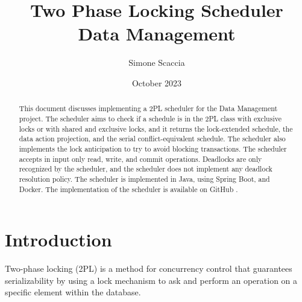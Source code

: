 \documentclass{article}
\title{Two Phase Locking Scheduler \\ Data Management}
\author{Simone Scaccia}
\date{October 2023}
\begin{document}
\maketitle

\begin{abstract}
This document discusses implementing a 2PL scheduler for the Data Management project. The scheduler aims to check if a schedule is in the 2PL class with exclusive locks or with shared and exclusive locks, and it returns the lock-extended schedule, the data action projection, and the serial conflict-equivalent schedule. The scheduler also implements the lock anticipation to try to avoid blocking transactions. The scheduler accepts in input only read, write, and commit operations. Deadlocks are only recognized by the scheduler, and the scheduler does not implement any deadlock resolution policy. The scheduler is implemented in Java, using Spring Boot, and Docker. The implementation of the scheduler is available on GitHub \cite{github}.
\end{abstract}

\section{Introduction}
Two-phase locking (2PL) is a method for concurrency control that guarantees serializability by using a lock mechanism to ask and perform an operation on a specific element within the database.
\end{document}

